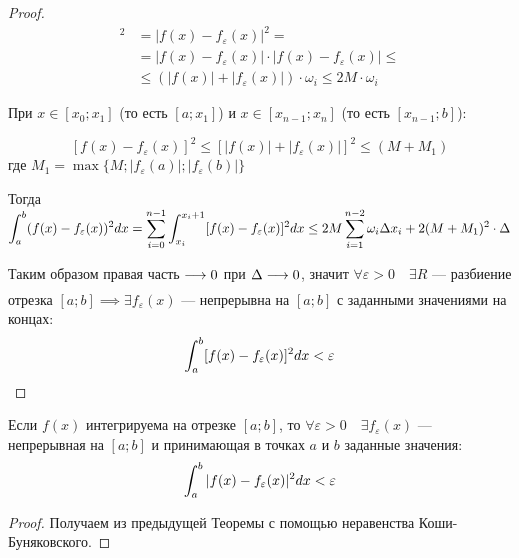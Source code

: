 \begin{proof}
    \begin{align*}
        [f(x) - f_\varepsilon(x)]^2 &= |f(x) - f_\varepsilon(x)|^2 = \\
        &= |f(x) - f_\varepsilon(x)| \cdot |f(x) - f_\varepsilon(x)| \leq \\ 
        &\leq (|f(x)| + |f_\varepsilon(x)|) \cdot \omega_i \leq 2 M \cdot \omega_i
    \end{align*}

    При $x \in [x_0; x_1]$ (то есть $[a; x_1]$) и 
    $x \in [x_{n - 1}; x_n]$ (то есть $[x_{n - 1}; b]$):

    \[ [f(x) - f_\varepsilon(x)]^2 \leq [|f(x)| + |f_\varepsilon(x)|]^2 \leq (M + M_1) \]
    где $M_1 = \max \{ M; |f_\varepsilon(a)|; |f_\varepsilon(b)| \}$

    Тогда $\displaystyle\int_a^b (f(x) - f_\varepsilon(x))^2 dx = 
    \displaystyle\sum_{i = 0}^{n - 1} \displaystyle\int_{x_i}^{x_i + 1} [f(x) - f_\varepsilon(x)]^2 dx \leq
    2M \displaystyle\sum_{i = 1}^{n - 2} \omega_i \Delta x_i + 2(M + M_1)^2 \cdot \Delta$

    Таким образом правая часть $\underset{}{\longrightarrow} 0$ при $\Delta \underset{}{\longrightarrow} 0$,
    значит $\forall \varepsilon > 0 \quad \exists R$ --- разбиение отрезка
    $[a; b] \implies \exists f_\varepsilon(x)$ --- непрерывна на $[a; b]$ с
    заданными значениями на концах:
    \[ \displaystyle\int_a^b [f(x) - f_\varepsilon(x)]^2 dx < \varepsilon \]
\end{proof}

\begin{corollary}
    Если $f(x)$ интегрируема на отрезке $[a; b]$, то $\forall \varepsilon > 0
    \quad \exists f_\varepsilon(x)$ --- непрерывная на $[a; b]$ и принимающая
    в точках $a$ и $b$ заданные значения:
    \[ \displaystyle\int_a^b |f(x) - f_\varepsilon(x)|^2 dx < \varepsilon \]
\end{corollary}
\begin{proof}
    Получаем из предыдущей Теоремы с помощью неравенства Коши-Буняковского.
\end{proof}
